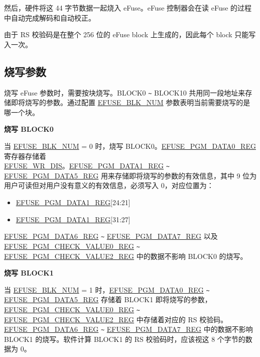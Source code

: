\documentclass[main\_\_CN.tex]{subfiles}
\begin{document}
然后，硬件将这 44 字节数据一起烧入 eFuse。eFuse 控制器会在读 eFuse 的过程中自动完成解码和自动校正。

由于 RS 校验码是在整个 256 位的 eFuse block 上生成的，因此每个 block 只能写入一次。

\subsection{烧写参数}
\label{sec:efuse-software-programming-para}


烧写 eFuse 参数时，需要按块烧写。BLOCK0 \verb+~+ BLOCK10 共用同一段地址来存储即将烧写的参数。通过配置 \hyperref[fielddesc:EFUSEBLKNUM]{EFUSE\_BLK\_NUM} 参数表明当前需要烧写的是哪一个块。

{\bfseries 烧写 BLOCK0}

当 \hyperref[fielddesc:EFUSEBLKNUM]{EFUSE\_BLK\_NUM} = 0 时，烧写 BLOCK0。\hyperref[regdesc:EFUSEPGMDATA0REG]{EFUSE\_PGM\_DATA0\_REG} 寄存器存储着\\ \hyperref[fielddesc:EFUSEWRDIS]{EFUSE\_WR\_DIS}。\hyperref[regdesc:EFUSEPGMDATA1REG]{EFUSE\_PGM\_DATA1\_REG} \verb+~+ \hyperref[regdesc:EFUSEPGMDATA5REG]{EFUSE\_PGM\_DATA5\_REG} 用来存储即将烧写的参数的有效信息，其中 9 位为用户可读但对用户没有意义的有效信息，必须写入 0，对应位置为：

\begin{itemize}
    \item \hyperref[regdesc:EFUSEPGMDATA1REG]{EFUSE\_PGM\_DATA1\_REG}[24:21]
    \item \hyperref[regdesc:EFUSEPGMDATA1REG]{EFUSE\_PGM\_DATA1\_REG}[31:27]
\end{itemize}


\hyperref[regdesc:EFUSEPGMDATA6REG]{EFUSE\_PGM\_DATA6\_REG} \verb+~+ \hyperref[regdesc:EFUSEPGMDATA7REG]{EFUSE\_PGM\_DATA7\_REG} 以及\\ \hyperref[regdesc:EFUSEPGMCHECKVALUE0REG]{EFUSE\_PGM\_CHECK\_VALUE0\_REG} \verb+~+ \hyperref[regdesc:EFUSEPGMCHECKVALUE2REG]{EFUSE\_PGM\_CHECK\_VALUE2\_REG} 中的数据不影响 BLOCK0 的烧写。

{\bfseries 烧写 BLOCK1}

当 \hyperref[fielddesc:EFUSEBLKNUM]{EFUSE\_BLK\_NUM} = 1 时，\hyperref[regdesc:EFUSEPGMDATA0REG]{EFUSE\_PGM\_DATA0\_REG} \verb+~+ \hyperref[regdesc:EFUSEPGMDATA5REG]{EFUSE\_PGM\_DATA5\_REG} 存储着 BLOCK1 即将烧写的参数，\hyperref[regdesc:EFUSEPGMCHECKVALUE0REG]{EFUSE\_PGM\_CHECK\_VALUE0\_REG} \verb+~+ \hyperref[regdesc:EFUSEPGMCHECKVALUE2REG]{EFUSE\_PGM\_CHECK\_VALUE2\_REG} 中存储着对应的 RS 校验码。\hyperref[regdesc:EFUSEPGMDATA6REG]{EFUSE\_PGM\_DATA6\_REG} \verb+~+ \hyperref[regdesc:EFUSEPGMDATA7REG]{EFUSE\_PGM\_DATA7\_REG} 中的数据不影响 BLOCK1 的烧写。软件计算 BLOCK1 的 RS 校验码时，应该视这 8 个字节的数据为 0。
\end{document}
